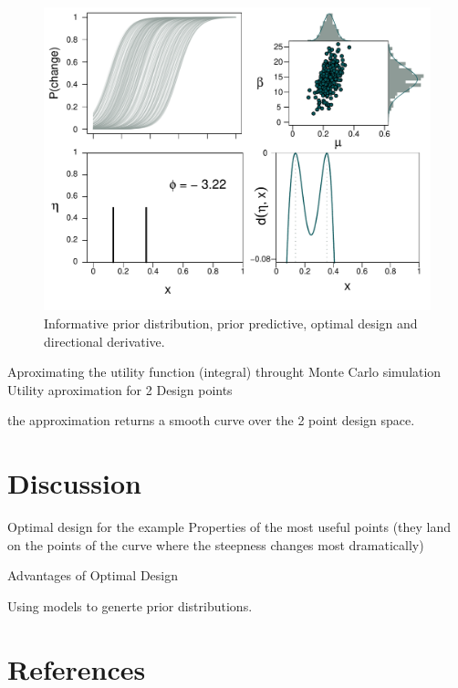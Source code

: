 \documentclass[preprint,review,12pt]{elsarticle}
\begin{document}
\begin{figure}
\includegraphics[width=\textwidth]{Joint_Normal.pdf}
\caption{Informative prior distribution, prior predictive, optimal design and directional derivative.}
\label{fig:jn}
\end{figure}

Aproximating the utility function (integral) throught Monte Carlo simulation 
Utility aproximation for 2 Design points 

the approximation returns a smooth curve over the 2 point design space.

\section{Discussion}
\label{S:4}

Optimal design for the example
Properties of the most useful points (they land on the points of the curve where the steepness changes most dramatically)

Advantages of Optimal Design

Using models to generte prior distributions.





\section*{References}



\end{document}
